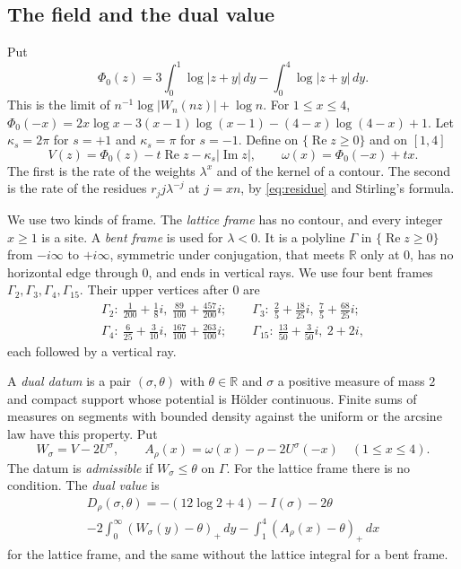 \documentclass[11pt]{amsart}
\theoremstyle{definition}
\theoremstyle{remark}
\numberwithin{equation}{section}
\newcommand{\R}{\mathbb R}
\begin{document}
\subsection{The field and the dual value}
Put
\[
 \Phi_0(z)=3\int_0^1\log|z+y|\,dy-\int_0^4\log|z+y|\,dy .
\]
This is the limit of $n^{-1}\log|W_n(nz)|+\log n$. For $1\le x\le4$,
$\Phi_0(-x)=2x\log x-3(x-1)\log(x-1)-(4-x)\log(4-x)+1$. Let $\kappa_s=2\pi$ for $s=+1$ and $\kappa_s=\pi$ for $s=-1$. Define
on $\{\operatorname{Re}z\ge0\}$ and on $[1,4]$
\[
 V(z)=\Phi_0(z)-t\operatorname{Re}z-\kappa_s|\operatorname{Im}z|,\qquad \omega(x)=\Phi_0(-x)+tx .
\]
The first is the rate of the weights $\lambda^x$ and of the kernel of a contour. The second is the rate of the
residues $r_jj\lambda^{-j}$ at $j=xn$, by \eqref{eq:residue} and Stirling's formula.

We use two kinds of frame. The \emph{lattice frame} has no contour, and every integer $x\ge1$ is a site. A \emph{bent
frame} is used for $\lambda<0$. It is a polyline $\Gamma$ in $\{\operatorname{Re}z\ge0\}$ from $-i\infty$ to $+i\infty$,
symmetric under conjugation, that meets $\R$ only at $0$, has no horizontal edge through $0$, and ends in vertical
rays. We use four bent frames $\Gamma_2,\Gamma_3,\Gamma_4,\Gamma_{15}$. Their upper vertices after $0$ are
\begin{gather*}
 \Gamma_2:\ \tfrac1{200}+\tfrac18i,\ \tfrac{89}{100}+\tfrac{457}{200}i;\qquad
 \Gamma_3:\ \tfrac25+\tfrac{18}{25}i,\ \tfrac75+\tfrac{68}{25}i;\\
 \Gamma_4:\ \tfrac6{25}+\tfrac3{10}i,\ \tfrac{167}{100}+\tfrac{263}{100}i;\qquad
 \Gamma_{15}:\ \tfrac{13}{50}+\tfrac3{50}i,\ 2+2i ,
\end{gather*}
each followed by a vertical ray.

A \emph{dual datum} is a pair $(\sigma,\theta)$ with $\theta\in\R$ and $\sigma$ a positive measure of mass $2$ and
compact support whose potential is H\"older continuous. Finite sums of measures on segments with bounded density
against the uniform or the arcsine law have this property. Put
\[
 W_\sigma=V-2U^\sigma,\qquad A_\rho(x)=\omega(x)-\rho-2U^\sigma(-x)\quad(1\le x\le4).
\]
The datum is \emph{admissible} if $W_\sigma\le\theta$ on $\Gamma$. For the lattice frame there is no condition. The
\emph{dual value} is
\begin{multline}\label{eq:dual}
 D_\rho(\sigma,\theta)=-(12\log2+4)-I(\sigma)-2\theta\\
 -2\int_0^\infty(W_\sigma(y)-\theta)_+\,dy-\int_1^4(A_\rho(x)-\theta)_+\,dx
\end{multline}
for the lattice frame, and the same without the lattice integral for a bent frame.
\end{document}
